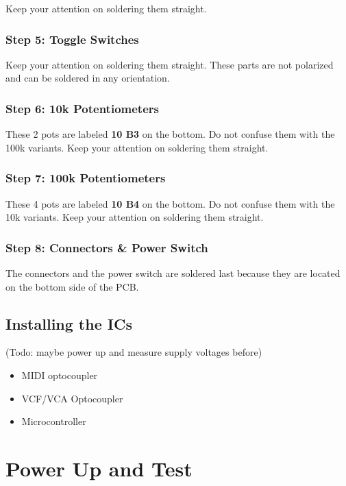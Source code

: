 \documentclass{scrartcl}
\begin{document}
Keep your attention on soldering them straight.

\subsubsection{Step 5: Toggle Switches}

Keep your attention on soldering them straight. These parts are not polarized and can be soldered in any orientation.

\subsubsection{Step 6: 10k Potentiometers}

These 2 pots are labeled \textbf{10 B3} on the bottom. Do not confuse them with the 100k variants. Keep your attention on soldering them straight.

\subsubsection{Step 7: 100k Potentiometers}

These 4 pots are labeled \textbf{10 B4} on the bottom. Do not confuse them with the 10k variants. Keep your attention on soldering them straight.

\subsubsection{Step 8: Connectors \& Power Switch}

The connectors and the power switch are soldered last because they are located on the bottom side of the PCB.

\subsection{Installing the ICs}

(Todo: maybe power up and measure supply voltages before)

\begin{itemize}
    \item MIDI optocoupler
    \item VCF/VCA Optocoupler
    \item Microcontroller
\end{itemize}

\section{Power Up and Test}
\end{document}
